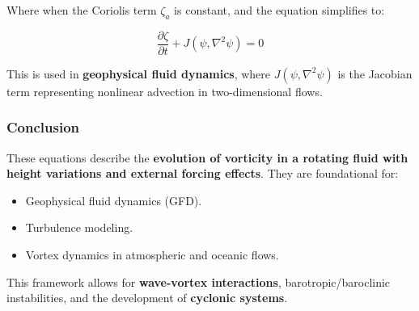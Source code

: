 \documentclass[12pt]{article}
\begin{document}
    Where when the Coriolis term $\zeta_a$ is constant, and the equation simplifies to:

    \begin{eqbox}
    \begin{equation}
        \frac{\partial \zeta}{\partial t}+J(\psi, \nabla^2 \psi)=0
    \end{equation}
    \end{eqbox}

    This is used in \textbf{geophysical fluid dynamics}, where $J(\psi, \nabla^2 \psi)$ is the Jacobian term representing nonlinear advection in
    two-dimensional flows.

    \subsubsection*{Conclusion}
    These equations describe the \textbf{evolution of vorticity in a rotating fluid with height variations and external forcing effects}. They are foundational for:
    \begin{itemize}
        \item Geophysical fluid dynamics (GFD).
        \item Turbulence modeling.
        \item Vortex dynamics in atmospheric and oceanic flows.
    \end{itemize}
    This framework allows for \textbf{wave-vortex interactions}, barotropic/baroclinic instabilities, and the development of \textbf{cyclonic systems}.

    \ifdefined\standalonechapter
    \else
    
    
    
\end{document}
